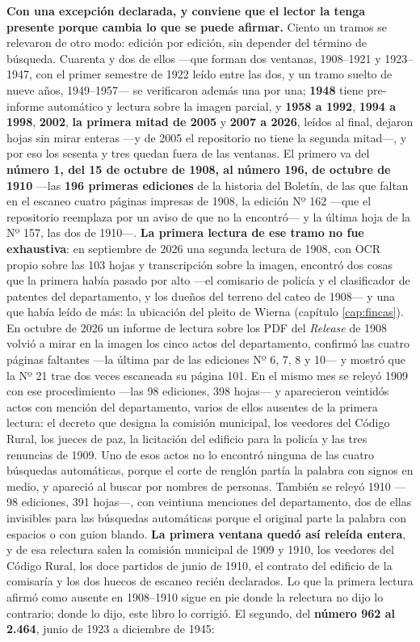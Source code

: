 \textbf{Con una excepción declarada, y conviene que el lector la tenga presente porque cambia
lo que se puede afirmar.} Ciento un tramos se relevaron de otro modo: edición por edición, sin depender del término de
búsqueda. Cuarenta y dos de ellos ---que forman dos ventanas, 1908--1921 y 1923--1947, con el primer semestre de 1922 leído entre las dos, y un tramo suelto de nueve años, 1949--1957--- se verificaron además una por una; \textbf{1948} tiene pre-informe automático y lectura sobre la imagen parcial, y \textbf{1958 a 1992}, \textbf{1994 a 1998}, \textbf{2002}, \textbf{la primera mitad de 2005} y \textbf{2007 a 2026}, leídos al final, dejaron hojas sin mirar enteras ---y de 2005 el repositorio no tiene la segunda mitad---, y por eso los sesenta y tres quedan fuera de las ventanas. El primero va del \textbf{número 1, del 15 de octubre de
1908, al número 196, de octubre de 1910} ---las \textbf{196 primeras ediciones} de la historia
del Boletín, de las que faltan en el escaneo cuatro páginas impresas de 1908, la edición Nº 162 ---que el repositorio reemplaza por un aviso de que no la encontró--- y la última hoja de la Nº 157, las dos de 1910---. \textbf{La primera lectura de ese tramo no fue exhaustiva}: en septiembre de 2026 una segunda lectura de 1908, con OCR propio sobre las 103 hojas y transcripción sobre la imagen, encontró dos cosas que la primera había pasado por alto ---el comisario de policía y el clasificador de patentes del departamento, y los dueños del terreno del cateo de 1908--- y una que había leído de más: la ubicación del pleito de Wierna (capítulo \ref{cap:fincas}). En octubre de 2026 un informe de lectura sobre los PDF del \textit{Release} de 1908 volvió a mirar en la imagen los cinco actos del departamento, confirmó las cuatro páginas faltantes ---la última par de las ediciones Nº 6, 7, 8 y 10--- y mostró que la Nº 21 trae dos veces escaneada su página 101. En el mismo mes se releyó 1909 con ese procedimiento ---las 98 ediciones, 398 hojas--- y aparecieron veintidós actos con mención del departamento, varios de ellos ausentes de la primera lectura: el decreto que designa la comisión municipal, los veedores del Código Rural, los jueces de paz, la licitación del edificio para la policía y las tres renuncias de 1909. Uno de esos actos no lo encontró ninguna de las cuatro búsquedas automáticas, porque el corte de renglón partía la palabra con signos en medio, y apareció al buscar por nombres de personas. También se releyó 1910 ---98 ediciones, 391 hojas---, con veintiuna menciones del departamento, dos de ellas invisibles para las búsquedas automáticas porque el original parte la palabra con espacios o con guion blando. \textbf{La primera ventana quedó así releída entera}, y de esa relectura salen la comisión municipal de 1909 y 1910, los veedores del Código Rural, los doce partidos de junio de 1910, el contrato del edificio de la comisaría y los dos huecos de escaneo recién declarados. Lo que la primera lectura afirmó como ausente en 1908--1910 sigue en pie donde la relectura no dijo lo contrario; donde lo dijo, este libro lo corrigió. El segundo, del \textbf{número 962 al 2.464}, junio de 1923 a diciembre de 1945:
